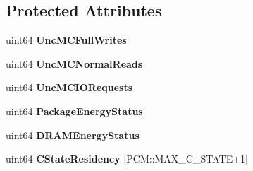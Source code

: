 \subsection*{Protected Attributes}
\begin{DoxyCompactItemize}
\item 
uint64 {\bfseries Unc\+M\+C\+Full\+Writes}\label{classUncoreCounterState_a3e59bb4c79f6040b17b104194a5e29fb}

\item 
uint64 {\bfseries Unc\+M\+C\+Normal\+Reads}\label{classUncoreCounterState_a5a07c23a907365682137c5d8c1cf79ad}

\item 
uint64 {\bfseries Unc\+M\+C\+I\+O\+Requests}\label{classUncoreCounterState_a4c3d0db74283d9420d9089e2c2553561}

\item 
uint64 {\bfseries Package\+Energy\+Status}\label{classUncoreCounterState_a74bdee47e68bbc55c2ee023fc3bfe76d}

\item 
uint64 {\bfseries D\+R\+A\+M\+Energy\+Status}\label{classUncoreCounterState_a03c78bbb9fb36c84c075b8d72fc5eed9}

\item 
uint64 {\bfseries C\+State\+Residency} [P\+C\+M\+::\+M\+A\+X\+\_\+\+C\+\_\+\+S\+T\+A\+TE+1]\label{classUncoreCounterState_a5819f82036b4386ca638d0755cdc7388}

\end{DoxyCompactItemize}
